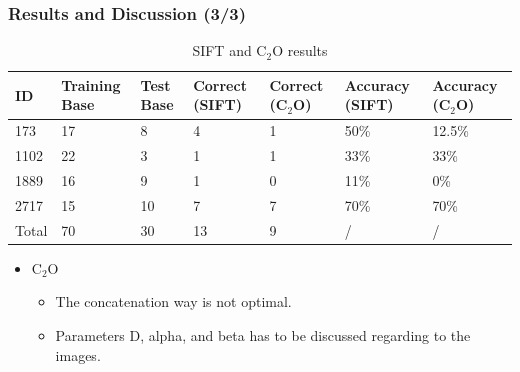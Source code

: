 \documentclass[xcolor=table]{beamer}
\begin{document}
\begin{frame} \frametitle{Results and Discussion (3/3)}



\begin{tiny}
\begin{table}[H]
\centering
\caption{SIFT and C$_2$O results}
\label{tab1}
\begin{tabular}{|l|l|l|l|l||l|l|}
\hline
ID & Training Base & Test Base & Correct (SIFT) & Correct (C$_2$O) & Accuracy (SIFT) & Accuracy (C$_2$O) \\ \hline
173 & 17 & 8 & 4 & 1 & 50\% & 12.5\% \\ \hline
1102 & 22 & 3 & 1 & 1 & \cellcolor{red!75} 33\% &\cellcolor{red!75} 33\% \\ \hline
1889 & 16 & 9 & 1 & 0 & 11\% & 0\% \\ \hline
2717 & 15 & 10 & 7 & 7 &\cellcolor{red!75} 70\% &\cellcolor{red!75} 70\% \\ \hline
Total & 70 & 30 & 13 & 9 & / & / \\ \hline
\end{tabular}
\end{table}
\end{tiny}

\begin{itemize}
\item C$_2$O
\vspace{0.3cm}
\begin{itemize}
\item The concatenation way is not optimal.
\item Parameters D, alpha, and beta has to be discussed regarding to the images.
\end{itemize}
\end{itemize}
\end{frame}
\end{document}
